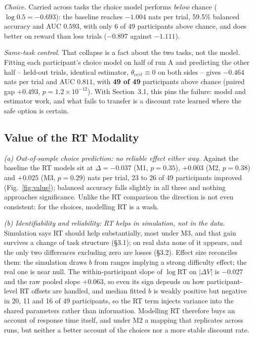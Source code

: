 \documentclass[11pt,a4paper]{article}
\begin{document}
\emph{Choice.} Carried across tasks the choice model performs \emph{below} chance
($\log0.5=-0.693$): the baseline reaches $-1.004$ nats per trial, 59.5\% balanced accuracy and
AUC $0.593$, with only 6 of 49 participants above chance, and does better on reward than loss
trials ($-0.897$ against $-1.111$).

\emph{Same-task control.} That collapse is a fact about the two tasks, not the model. Fitting
each participant's choice model on half of run A and predicting the other half -- held-out
trials, identical estimator, $\theta_{cert}\equiv0$ on both sides -- gives $-0.464$ nats per
trial and AUC $0.811$, with \textbf{49 of 49} participants above chance (paired gap $+0.493$,
$p=1.2\times10^{-12}$). With Section~3.1, this pins the failure: model and estimator work, and
what fails to transfer is a discount rate learned where the safe option is certain.

\subsection{Value of the RT Modality}

\emph{(a) Out-of-sample choice prediction: no reliable effect either way.} Against the baseline
the RT models sit at $\Delta=-0.037$ (M1, $p=0.35$), $+0.003$ (M2, $p=0.38$) and $+0.025$ (M3,
$p=0.29$) nats per trial, 23 to 26 of 49 participants improved (Fig.~\ref{fig:value}); balanced
accuracy falls slightly in all three and nothing approaches significance. Unlike the RT
comparison the direction is not even consistent: for the choices, modelling RT is a wash.

\emph{(b) Identifiability and reliability: RT helps in simulation, not in the data.} Simulation
says RT should help substantially, most under M3, and that gain survives a change of task
structure (\S3.1); on real data none of it appears, and the only two differences excluding zero
are losses (\S3.2). Effect size reconciles them: the simulation draws $b$ from ranges implying a
strong difficulty effect; the real one is near null. The within-participant slope of
$\log$RT on $|\Delta V|$ is $-0.027$ and the raw pooled slope $+0.063$, so even its sign depends
on how participant-level RT offsets are handled, and median fitted $b$ is weakly positive but
negative in 20, 11 and 16 of 49 participants, so the RT term injects variance into the shared
parameters rather than information. Modelling RT therefore buys an account of
response time itself, and under M2 a mapping that replicates across runs, but neither a better
account of the choices nor a more stable discount rate.
\end{document}
